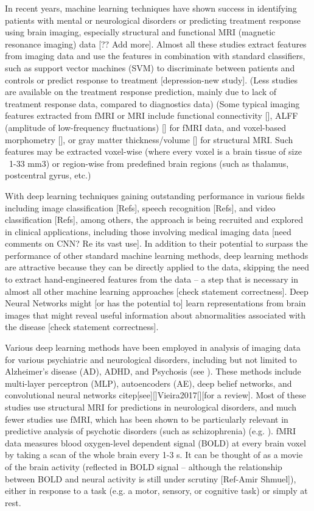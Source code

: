\documentclass{article} %
\begin{document}
In recent years, machine learning techniques have shown success in identifying patients with mental or neurological disorders or predicting treatment response using brain imaging, especially structural and functional MRI (magnetic resonance imaging) data \citep{Gheiratmand2017, Orru2012} [?? Add more]. Almost all these studies extract features from imaging data and use the features in combination with standard classifiers, such as support vector machines (SVM) \citep{Orru2012, Wolfers2015} to discriminate between patients and controls or predict response to treatment [depression-new study]. (Less studies are available on the treatment response prediction, mainly due to lack of treatment response data, compared to diagnostics data) (Some typical imaging features extracted from fMRI or MRI include functional connectivity [], ALFF (amplitude of low-frequency fluctuations) [] for fMRI data, and voxel-based morphometry [], or gray matter thickness/volume [] for structural MRI. Such features may be extracted voxel-wise (where every voxel is a brain tissue of size ~1-33 mm3) or region-wise from predefined brain regions (such as thalamus, postcentral gyrus, etc.)

With deep learning techniques gaining outstanding performance in various fields including image classification [Refs], speech recognition [Refs], and video classification [Refs], among others, the approach is being recruited and explored in clinical applications, including those involving medical imaging data \citep{Shen2017, Litjens2017, Gulshan2016} [need comments on CNN? Re its vast use]. In addition to their potential to surpass the performance of other standard machine learning methods, deep learning methods are attractive because they can be directly applied to the data, skipping the need to extract hand-engineered features from the data – a step that is necessary in almost all other machine learning approaches [check statement correctness]. Deep Neural Networks might [or has the potential to] learn representations from brain images that might reveal useful information about abnormalities associated with the disease [check statement correctness].

Various deep learning methods have been employed in analysis of imaging data for various psychiatric and neurological disorders, including but not limited to Alzheimer’s disease (AD), ADHD, and Psychosis (see \citep{Vieira2017}). These methods include multi-layer perceptron (MLP), autoencoders (AE), deep belief networks, and convolutional neural networks citep[see][]{Vieira2017}[][for a review]. Most of these studies use structural MRI for predictions in neurological disorders, and much fewer studies use fMRI, which has been shown to be particularly relevant in predictive analysis of psychotic disorders (such as schizophrenia) (e.g. \citep{Damaraju2014, Calhoun2009}). fMRI data measures blood oxygen-level dependent signal (BOLD) at every brain voxel by taking a scan of the whole brain every 1-3 s. It can be thought of as a movie of the brain activity (reflected in BOLD signal – although the relationship between BOLD and neural activity is still under scrutiny [Ref-Amir Shmuel]), either in response to a task (e.g. a motor, sensory, or cognitive task) or simply at rest.
\end{document}

